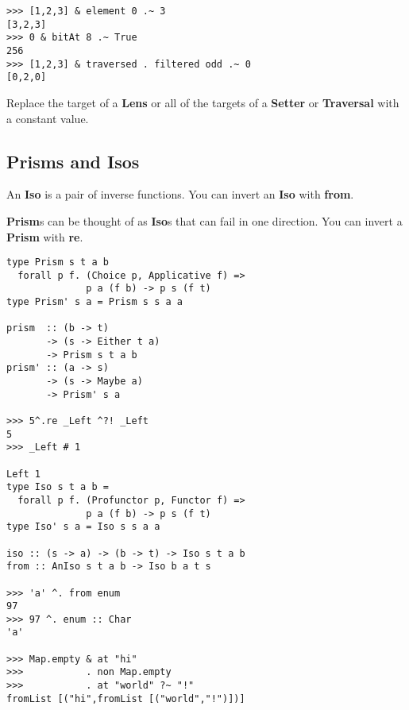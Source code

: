 \begin{multicols}{2}
\begin{box1}
\begin{verbatim}
>>> [1,2,3] & element 0 .~ 3
[3,2,3]
>>> 0 & bitAt 8 .~ True
256
>>> [1,2,3] & traversed . filtered odd .~ 0
[0,2,0]
\end{verbatim}

Replace the target of a \textbf{Lens} or all of the targets of a
\textbf{Setter} or \textbf{Traversal} with a constant value.

\end{box1}

\begin{box2}
\subsection *{Prisms and Isos}

An \textbf{Iso} is a pair of inverse functions. You can invert an \textbf{Iso} with \textbf{from}.

\textbf{Prism}s can be thought of as \textbf{Iso}s that can fail in one
direction. You can invert a \textbf{Prism} with \textbf{re}.

\begin{verbatim}
type Prism s t a b 
  forall p f. (Choice p, Applicative f) =>
              p a (f b) -> p s (f t)
type Prism' s a = Prism s s a a

prism  :: (b -> t)
       -> (s -> Either t a)
       -> Prism s t a b
prism' :: (a -> s)
       -> (s -> Maybe a)
       -> Prism' s a

>>> 5^.re _Left ^?! _Left
5
>>> _Left # 1

Left 1
type Iso s t a b =
  forall p f. (Profunctor p, Functor f) =>
              p a (f b) -> p s (f t)
type Iso' s a = Iso s s a a

iso :: (s -> a) -> (b -> t) -> Iso s t a b
from :: AnIso s t a b -> Iso b a t s

>>> 'a' ^. from enum
97
>>> 97 ^. enum :: Char
'a'

>>> Map.empty & at "hi"
>>>           . non Map.empty
>>>           . at "world" ?~ "!"
fromList [("hi",fromList [("world","!")])]
\end{verbatim}

\end{box2}

\end{multicols}

